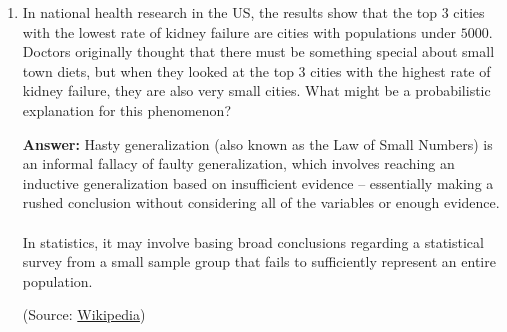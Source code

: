 \documentclass{article}
\newenvironment{QandA}{\begin{enumerate}[label=\arabic*.]}{\end{enumerate}}
\newenvironment{answer}{\par\normalfont \textbf{Answer:}}{}
\newcommand{\Exp}[1]{\mathbb{E}\left[ #1 \right]}
\newcommand{\g}{\vert}
\begin{document}
\begin{QandA}
\begin{answer}
\begin{align*}
        \end{align*}
        with the same logic applying as above. By similar logic, $\Exp{X \g HT} = \Exp{X}$. Moreover, $\Exp{X \g HH} = 0$ since we don't need any additional flips. \\\\
        Therefore, we have the following equations:
        \begin{align*}
            \Exp{X} &= \frac{1}{2} \left( 1 + \Exp{X \g H} \right) + \frac{1}{2} \left( 1 + \Exp{X} \right) \\
            \Exp{X \g H} &= \frac{1}{2} \left( 1 + 0 \right) + \frac{1}{2} \left( 1 + \Exp{X} \right) = 1 + \frac{1}{2}\Exp{X}
        \end{align*}
        By substituting the expression for $\Exp{X \g H}$, we obtain $\Exp{X} = 6$.
        
        (Source: \href{https://qr.ae/pvgtDB}{Quora})
    \end{answer}
    
    \item In national health research in the US, the results show that the top $3$ cities with the lowest rate of kidney failure are cities with populations under $5000$. Doctors originally thought that there must be something special about small town diets, but when they looked at the top $3$ cities with the highest rate of kidney failure, they are also very small cities. What might be a probabilistic explanation for this phenomenon?
    \begin{answer}
        Hasty generalization (also known as the Law of Small Numbers) is an informal fallacy of faulty generalization, which involves reaching an inductive generalization based on insufficient evidence -- essentially making a rushed conclusion without considering all of the variables or enough evidence. \\\\
        In statistics, it may involve basing broad conclusions regarding a statistical survey from a small sample group that fails to sufficiently represent an entire population. 
        
        (Source: \href{https://en.wikipedia.org/wiki/Faulty_generalization#Hasty_generalization}{Wikipedia})
    \end{answer}
    

\end{QandA}
\end{document}
